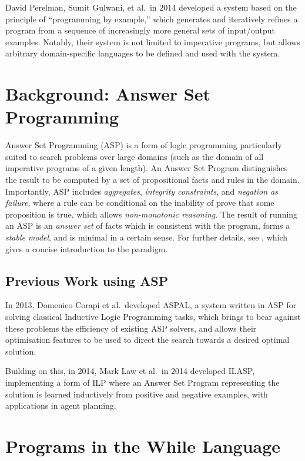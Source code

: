 \documentclass[a4paper,twoside,notitlepage]{report}
\begin{document}
David Perelman, Sumit Gulwani, et al.\ in 2014 developed a system\cite{tds} 
based on the principle of ``programming by example,'' which generates and 
iteratively refines a program from a sequence of increasingly more general 
sets of input/output examples. Notably, their system is not limited to 
imperative programs, but allows arbitrary domain-specific languages to be 
defined and used with the system.

\chapter{Background: Answer Set Programming} \label{chp:bkgasp}

Answer Set Programming (ASP) is a form of logic programming particularly
suited to search problems over large domains (such as the domain of all
imperative programs of a given length). An Answer Set Program distinguishes
the result to be computed by a set of propositional facts and rules in the
domain. Importantly, ASP includes \emph{aggregates}, \emph{integrity
constraints}, and \emph{negation as failure}, where a rule can be conditional
on the inability of prove that some proposition is true, which allows
\emph{non-monotonic reasoning}. The result of running an ASP is an
\emph{answer set} of facts which is consistent with the program, forms a
\emph{stable model}, and is minimal in a certain sense. For further details,
see \cite{glimpse}, which gives a concise introduction to the paradigm.

\section{Previous Work using ASP}

In 2013, Domenico Corapi et al.\ developed ASPAL\cite{aspal}, a system written
in ASP for solving classical Inductive Logic Programming tasks, which brings
to bear against these problems the efficiency of existing ASP solvers, and
allows their optimisation features to be used to direct the search towards a
desired optimal solution.

Building on this, in 2014, Mark Law et al.\ in 2014 developed
ILASP\cite{ilasp}, implementing a form of ILP where an Answer Set Program
representing the solution is learned inductively from positive and negative
examples, with applications in agent planning.

\chapter{Programs in the While Language} \label{chp:whilan}
\end{document}
